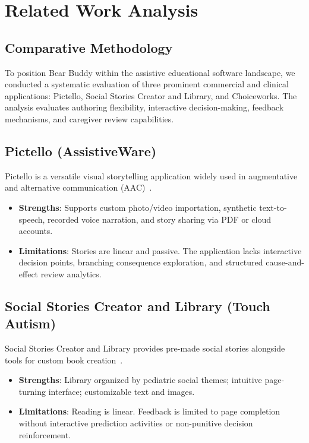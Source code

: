 \section{Related Work Analysis}

\subsection{Comparative Methodology}

To position Bear Buddy within the assistive educational software landscape, we conducted a systematic evaluation of three prominent commercial and clinical applications: Pictello, Social Stories Creator and Library, and Choiceworks. The analysis evaluates authoring flexibility, interactive decision-making, feedback mechanisms, and caregiver review capabilities.

\subsection{Pictello (AssistiveWare)}

Pictello is a versatile visual storytelling application widely used in augmentative and alternative communication (AAC)~\cite{pictello}.
\begin{itemize}
    \item \textbf{Strengths}: Supports custom photo/video importation, synthetic text-to-speech, recorded voice narration, and story sharing via PDF or cloud accounts.
    \item \textbf{Limitations}: Stories are linear and passive. The application lacks interactive decision points, branching consequence exploration, and structured cause-and-effect review analytics.
\end{itemize}

\subsection{Social Stories Creator and Library (Touch Autism)}

Social Stories Creator and Library provides pre-made social stories alongside tools for custom book creation~\cite{social_stories_creator}.
\begin{itemize}
    \item \textbf{Strengths}: Library organized by pediatric social themes; intuitive page-turning interface; customizable text and images.
    \item \textbf{Limitations}: Reading is linear. Feedback is limited to page completion without interactive prediction activities or non-punitive decision reinforcement.
\end{itemize}

